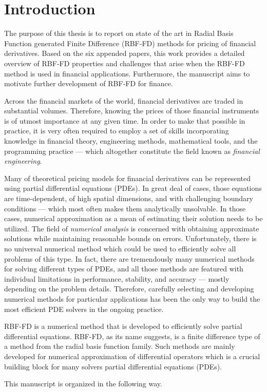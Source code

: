 \documentclass{UUThesisTemplate}
\begin{document}
\chapter{Introduction}
\label{ch:introduction}
\par
The purpose of this thesis is to report on state of the art in Radial Basis Function generated Finite Difference (RBF-FD) methods for pricing of financial derivatives. Based on the six appended papers, this work provides a detailed overview of RBF-FD properties and challenges that arise when the RBF-FD method is used in financial applications. Furthermore, the manuscript aims to motivate further development of RBF-FD for finance.
\par
Across the financial markets of the world, financial derivatives are traded in substantial volumes. Therefore, knowing the prices of those financial instruments is of utmost importance at any given time. In order to make that possible in practice, it is very often required to employ a set of skills incorporating knowledge in financial theory, engineering methods, mathematical tools, and the programming practice --- which altogether constitute the field known as \emph{financial engineering}. 
\par
Many of theoretical pricing models for financial derivatives can be represented using partial differential equations (PDEs). In great deal of cases, those equations are time-dependent, of high spatial dimensions, and with challenging boundary conditions --- which most often makes them analytically unsolvable. In those cases, numerical approximation as a mean of estimating their solution needs to be utilized. The field of \emph{numerical analysis} is concerned with obtaining approximate solutions while maintaining reasonable bounds on errors. Unfortunately, there is no universal numerical method which could be used to efficiently solve all problems of this type. In fact, there are tremendously many numerical methods for solving different types of PDEs, and all those methods are featured with individual limitations in performance, stability, and accuracy --- mostly depending on the problem details. Therefore, carefully selecting and developing numerical methods for particular applications has been the only way to build the most efficient PDE solvers in the ongoing practice. 
\par
RBF-FD is a numerical method that is developed to efficiently solve partial differential equations. RBF-FD, as its name suggests, is a finite difference type of a method from the radial basis function family. Such methods are mainly developed for numerical approximation of differential operators which is a crucial building block for many solvers partial differential equations (PDEs).
\par
This manuscript is organized in the following way. 
\end{document}
